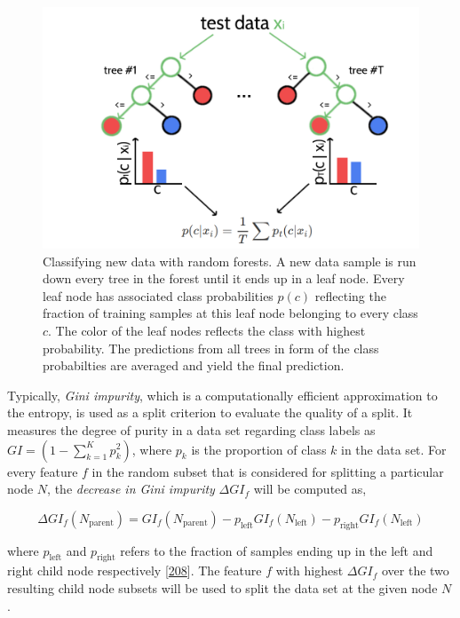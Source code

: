 \documentclass[11pt,a4paper,twoside]{book}
\theoremstyle{definition}
\theoremstyle{definition}
\theoremstyle{remark}
\begin{document}
\begin{figure}

{\centering \includegraphics[width=0.8\linewidth]{img/random_forest_contact_prior/intro_random_forest} 

}

\caption{Classifying new data with random forests. A new
data sample is run down every tree in the forest until it ends up in a
leaf node. Every leaf node has associated class probabilities \(p(c)\)
reflecting the fraction of training samples at this leaf node belonging
to every class \(c\). The color of the leaf nodes reflects the class
with highest probability. The predictions from all trees in form of the
class probabilties are averaged and yield the final prediction.}\label{fig:rf-intro}
\end{figure}

Typically, \emph{Gini impurity}, which is a computationally efficient
approximation to the entropy, is used as a split criterion to evaluate
the quality of a split. It measures the degree of purity in a data set
regarding class labels as \(GI = (1 - \sum_{k=1}^K p_k^2)\), where
\(p_k\) is the proportion of class \(k\) in the data set. For every
feature \(f\) in the random subset that is considered for splitting a
particular node \(N\), the \emph{decrease in Gini impurity}
\(\Delta GI_f\) will be computed as,

\[
\Delta GI_f(N_{\textrm{parent}}) = GI_f(N_{\textrm{parent}}) - p_{\textrm{left}} GI_f(N_{\textrm{left}}) - p_{\textrm{right}} GI_f(N_{\textrm{left}})
\]

where \(p_{\textrm{left}}\) and \(p_{\textrm{right}}\) refers to the
fraction of samples ending up in the left and right child node
respectively {[}\protect\hyperlink{ref-Menze2009}{208}{]}. The feature
\(f\) with highest \(\Delta GI_f\) over the two resulting child node
subsets will be used to split the data set at the given node \(N\).
\end{document}
